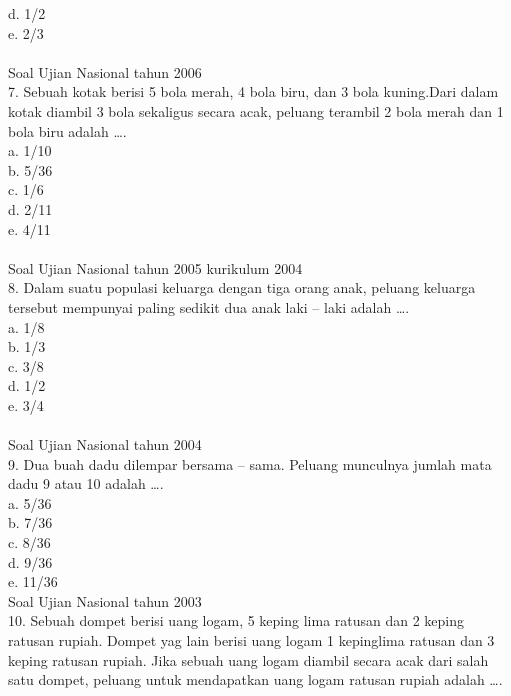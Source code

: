 \documentclass[11pt,fleqn]{book} %
\begin{document}
d. 1/2\\

e. 2/3\\
\\

Soal Ujian Nasional tahun 2006\\
7. Sebuah kotak berisi 5 bola merah, 4 bola biru, dan 3 bola kuning.Dari dalam kotak diambil 3 bola sekaligus secara acak, peluang terambil 2 bola merah dan 1 bola biru adalah ….\\

a. 1/10\\

b. 5/36\\

c. 1/6\\

d. 2/11\\

e. 4/11\\
\\

Soal Ujian Nasional tahun 2005 kurikulum 2004\\
8. Dalam suatu populasi keluarga dengan tiga orang anak, peluang keluarga tersebut mempunyai paling sedikit dua anak laki – laki adalah ….\\

a. 1/8\\

b. 1/3\\

c. 3/8\\

d. 1/2\\

e. 3/4\\
\\

Soal Ujian Nasional tahun 2004\\
9. Dua buah dadu dilempar bersama – sama. Peluang munculnya jumlah mata dadu 9 atau 10 adalah ….\\

a. 5/36\\

b. 7/36\\

c. 8/36\\

d. 9/36\\

e. 11/36\\

Soal Ujian Nasional tahun 2003\\
10. Sebuah dompet berisi uang logam, 5 keping lima ratusan dan 2 keping ratusan rupiah. Dompet yag lain berisi uang logam 1 kepinglima ratusan dan 3 keping ratusan rupiah. Jika sebuah uang logam diambil secara acak dari salah satu dompet, peluang untuk mendapatkan uang logam ratusan rupiah adalah ….\\
\end{document}
